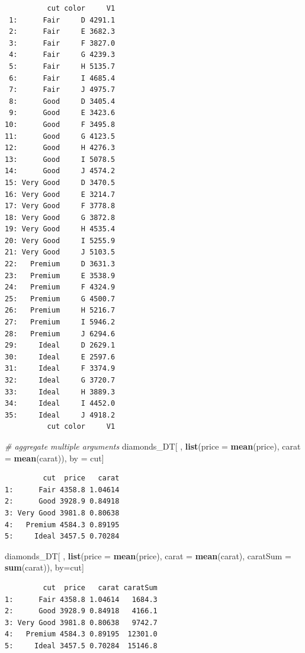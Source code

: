 \documentclass[
]{book}
\newenvironment{Shaded}{\begin{snugshade}}{\end{snugshade}}
\newcommand{\CommentTok}[1]{\textcolor[rgb]{0.56,0.35,0.01}{\textit{#1}}}
\newcommand{\DataTypeTok}[1]{\textcolor[rgb]{0.13,0.29,0.53}{#1}}
\newcommand{\KeywordTok}[1]{\textcolor[rgb]{0.13,0.29,0.53}{\textbf{#1}}}
\newcommand{\NormalTok}[1]{#1}
\newcommand{\StringTok}[1]{\textcolor[rgb]{0.31,0.60,0.02}{#1}}
\begin{document}
\begin{verbatim}
          cut color     V1
 1:      Fair     D 4291.1
 2:      Fair     E 3682.3
 3:      Fair     F 3827.0
 4:      Fair     G 4239.3
 5:      Fair     H 5135.7
 6:      Fair     I 4685.4
 7:      Fair     J 4975.7
 8:      Good     D 3405.4
 9:      Good     E 3423.6
10:      Good     F 3495.8
11:      Good     G 4123.5
12:      Good     H 4276.3
13:      Good     I 5078.5
14:      Good     J 4574.2
15: Very Good     D 3470.5
16: Very Good     E 3214.7
17: Very Good     F 3778.8
18: Very Good     G 3872.8
19: Very Good     H 4535.4
20: Very Good     I 5255.9
21: Very Good     J 5103.5
22:   Premium     D 3631.3
23:   Premium     E 3538.9
24:   Premium     F 4324.9
25:   Premium     G 4500.7
26:   Premium     H 5216.7
27:   Premium     I 5946.2
28:   Premium     J 6294.6
29:     Ideal     D 2629.1
30:     Ideal     E 2597.6
31:     Ideal     F 3374.9
32:     Ideal     G 3720.7
33:     Ideal     H 3889.3
34:     Ideal     I 4452.0
35:     Ideal     J 4918.2
          cut color     V1
\end{verbatim}

\begin{Shaded}
\begin{Highlighting}[]
\CommentTok{# aggregate multiple arguments}
\NormalTok{diamonds_DT[ , }\KeywordTok{list}\NormalTok{(}\DataTypeTok{price =} \KeywordTok{mean}\NormalTok{(price), }\DataTypeTok{carat =} \KeywordTok{mean}\NormalTok{(carat)), by =}\StringTok{ }\NormalTok{cut]}
\end{Highlighting}
\end{Shaded}

\begin{verbatim}
         cut  price   carat
1:      Fair 4358.8 1.04614
2:      Good 3928.9 0.84918
3: Very Good 3981.8 0.80638
4:   Premium 4584.3 0.89195
5:     Ideal 3457.5 0.70284
\end{verbatim}

\begin{Shaded}
\begin{Highlighting}[]
\NormalTok{diamonds_DT[ , }\KeywordTok{list}\NormalTok{(}\DataTypeTok{price =} \KeywordTok{mean}\NormalTok{(price), }\DataTypeTok{carat =} \KeywordTok{mean}\NormalTok{(carat), }\DataTypeTok{caratSum =} \KeywordTok{sum}\NormalTok{(carat)), by=cut]}
\end{Highlighting}
\end{Shaded}

\begin{verbatim}
         cut  price   carat caratSum
1:      Fair 4358.8 1.04614   1684.3
2:      Good 3928.9 0.84918   4166.1
3: Very Good 3981.8 0.80638   9742.7
4:   Premium 4584.3 0.89195  12301.0
5:     Ideal 3457.5 0.70284  15146.8
\end{verbatim}
\end{document}
